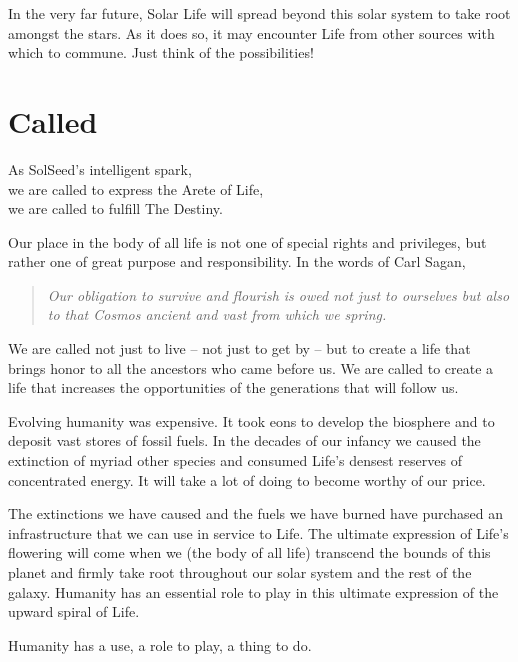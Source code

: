 \documentclass[ebook,12pt,openany,twoside]{memoir}
\newcommand{\tab}{\hspace*{2em}}
\newcommand{\imagefacingchapter}[1]{
  \cleartoverso
  \clearpage \null
  \thispagestyle{cleared}
  \AddToShipoutPictureBG*{%
    \AtStockLowerLeft{%
      \texttt{[image: \#1]}
    }
  }
  \clearpage
}
\begin{document}
In the very far future, Solar Life will spread beyond this solar system to take
root amongst the stars. As it does so, it may encounter Life from other sources
with which to commune.  Just think of the possibilities!







\imagefacingchapter{images/Called}
\chapter{Called}

\setlength\epigraphwidth{3.2in}
\epigraph{
  As SolSeed's intelligent spark,\\
  \tab we are called to express the Arete of Life,\\
  \tab we are called to fulfill The Destiny.
}{}

\noindent Our place in the body of all life is not one of special rights and
privileges, but rather one of great purpose and responsibility. In the words of
Carl Sagan,

\begin{quote}
\em
Our obligation to survive and flourish is owed not just to ourselves but also
to that Cosmos ancient and vast from which we spring.
\end{quote}

We are called not just to live -- not just to get by -- but to create a life
that brings honor to all the ancestors who came before us. We are called to
create a life that increases the opportunities of the generations that will
follow us.

Evolving humanity was expensive. It took eons to develop the biosphere and to
deposit vast stores of fossil fuels. In the decades of our infancy we caused
the extinction of myriad other species and consumed Life's densest reserves of
concentrated energy. It will take a lot of doing to become worthy of our price.

The extinctions we have caused and the fuels we have burned have purchased an
infrastructure that we can use in service to Life. The ultimate expression of
Life's flowering will come when we (the body of all life) transcend the bounds
of this planet and firmly take root throughout our solar system and the rest of
the galaxy. Humanity has an essential role to play in this ultimate expression
of the upward spiral of Life.

Humanity has a use, a role to play, a thing to do.
\end{document}

